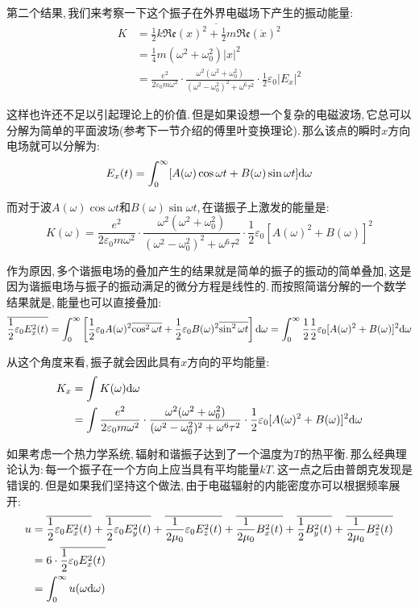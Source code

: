第二个结果,\,我们来考察一下这个振子在外界电磁场下产生的振动能量:
\begin{align*}
K 	&=\overline{\frac{1}{2}k \mathfrak{Re}(x)^2+\frac{1}{2}m \mathfrak{Re}(\dot{x})^2}\\
	&=\frac{1}{4}m(\omega^2+\omega_0^2)|x|^2\\
	&=\frac{e^2}{2\varepsilon_0 m\omega^2}\cdot \frac{\omega^2(\omega^2+\omega_0^2)}{(\omega^2-\omega_0^2)^2+\omega^6\tau^2}\cdot \frac{1}{2}\varepsilon_0 |E_x|^2
\end{align*}

这样也许还不足以引起理论上的价值.\,但是如果设想一个复杂的电磁波场,\,它总可以分解为简单的平面波场(参考下一节介绍的傅里叶变换理论).\,那么该点的瞬时$x$方向电场就可以分解为:
\[E_x(t)=\int_{0}^{\infty}[A(\omega)\cos{\omega t}+B(\omega)\sin{\omega t}]\textrm{d} \omega\]

而对于波$A(\omega)\cos{\omega t}$和$B(\omega)\sin{\omega t}$,\,在谐振子上激发的能量是:
\[K(\omega)=\frac{e^2}{2\varepsilon_0 m\omega^2}\cdot \frac{\omega^2(\omega^2+\omega_0^2)}{(\omega^2-\omega_0^2)^2+\omega^6\tau^2}\cdot \frac{1}{2}\varepsilon_0 [A(\omega)^2+B(\omega)]^2\]

作为原因,\,多个谐振电场的叠加产生的结果就是简单的振子的振动的简单叠加,\,这是因为谐振电场与振子的振动满足的微分方程是线性的.\,而按照简谐分解的一个数学结果就是,\,能量也可以直接叠加:
\[\overline{\frac{1}{2}\varepsilon_0 E_x^2(t)}=\int_{0}^{\infty}\left[\frac{1}{2}\varepsilon_0 A(\omega)^2\overline{\cos^2\omega t}+ \frac{1}{2}\varepsilon_0B(\omega)^2\overline{\sin^2\omega t}\right]\textrm{d}\omega=\int_{0}^{\infty}\frac{1}{2}\frac{1}{2}\varepsilon_0 [A(\omega)^2+B(\omega)]^2\textrm{d}\omega\]

从这个角度来看,\,振子就会因此具有$x$方向的平均能量:
\begin{align*}
K_x 	&=\int K(\omega) \textrm{d} \omega \\
		&=\int \frac{e^2}{2\varepsilon_0 m\omega^2}\cdot \frac{\omega^2(\omega^2+\omega_0^2)}{(\omega^2-\omega_0^2)^2+\omega^6\tau^2}\cdot \frac{1}{2}\varepsilon_0 [A(\omega)^2+B(\omega)]^2 \textrm{d} \omega
\end{align*}

如果考虑一个热力学系统,\,辐射和谐振子达到了一个温度为$T$的热平衡.\,那么经典理论认为:\,每一个振子在一个方向上应当具有平均能量$kT$.\,这一点之后由普朗克发现是错误的.\,但是如果我们坚持这个做法,\,由于电磁辐射的内能密度亦可以根据频率展开:
\begin{align*}
u 	&=\overline{\frac{1}{2}\varepsilon_0 E_x^2(t)}+\overline{\frac{1}{2}\varepsilon_0 E_y^2(t)}+\overline{\frac{1}{2\mu_0}\varepsilon_0 E_z^2(t)}+\overline{\frac{1}{2\mu_0} B_x^2(t)}+\overline{\frac{1}{2} B_y^2(t)}+\overline{\frac{1}{2\mu_0}B_z^2(t)}\\
	&=6\cdot \overline{\frac{1}{2}\varepsilon_0 E_x^2(t)}\\
	&=\int_0^\infty u(\omega \textrm{d} \omega)
\end{align*}

